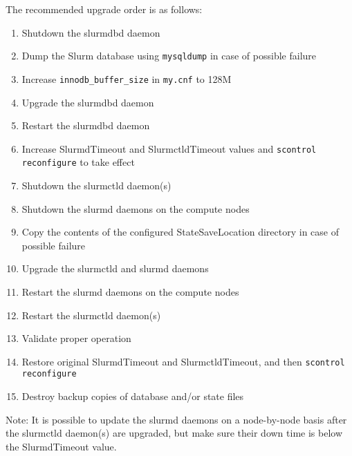 The recommended upgrade order is as follows:

        \begin{enumerate}
        \item Shutdown the slurmdbd daemon
        \item Dump the Slurm database using \texttt{mysqldump} in case of possible failure
        \item Increase \texttt{innodb\_buffer\_size} in \texttt{my.cnf} to 128M
        \item Upgrade the slurmdbd daemon
        \item Restart the slurmdbd daemon
        \item Increase SlurmdTimeout and SlurmctldTimeout values and \texttt{scontrol reconfigure} to take effect
        \item Shutdown the slurmctld daemon(s)
        \item Shutdown the slurmd daemons on the compute nodes
        \item Copy the contents of the configured StateSaveLocation directory in case of possible failure
        \item Upgrade the slurmctld and slurmd daemons
        \item Restart the slurmd daemons on the compute nodes
        \item Restart the slurmctld daemon(s)
        \item Validate proper operation
        \item Restore original SlurmdTimeout and SlurmctldTimeout, and then \texttt{scontrol reconfigure}
        \item Destroy backup copies of database and/or state files
        \end{enumerate}

Note: It is possible to update the slurmd daemons on a node-by-node basis after the slurmctld daemon(s) are upgraded, but make sure their down time is below the SlurmdTimeout value.
